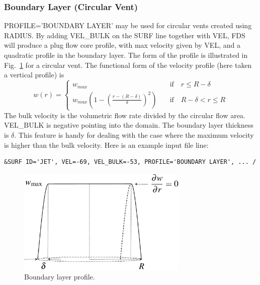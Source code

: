 \documentclass[11pt]{book}
\begin{document}
\subsubsection{Boundary Layer (Circular Vent)}

{\ct PROFILE='BOUNDARY LAYER'} may be used for circular vents created using {\ct RADIUS}. By adding {\ct VEL\_BULK} on the {\ct SURF} line together with {\ct VEL}, FDS will produce a plug flow core profile, with max velocity given by {\ct VEL}, and a quadratic profile in the boundary layer.  The form of the profile is illustrated in Fig.~\ref{fig:bl_profile} for a circular vent.  The functional form of the velocity profile (here taken a vertical profile) is
\begin{equation}
w(r) = \left\{ \begin{array}{ll} w_{\si{max}} & \quad \mbox{if} \quad r \le R-\delta \\ w_{\si{max}}\left(1 - \left(\frac{r-(R-\delta)}{\delta}\right)^2\right) & \quad \mbox{if} \quad R-\delta < r \le R \end{array} \right.
\end{equation}
The bulk velocity is the volumetric flow rate divided by the circular flow area.  {\ct VEL\_BULK} is negative pointing into the domain.  The boundary layer thickness is $\delta$.  This feature is handy for dealing with the case where the maximum velocity is higher than the bulk velocity.  Here is an example input file line:
\begin{lstlisting}
&SURF ID='JET', VEL=-69, VEL_BULK=-53, PROFILE='BOUNDARY LAYER', ... /
\end{lstlisting}

\begin{figure}[ht]
\begin{center}
\includegraphics[width=3.2in]{FIGURES/bl_profile}
\caption[Boundary layer profile]{Boundary layer profile.}
\label{fig:bl_profile}
\end{center}
\end{figure}
\end{document}
